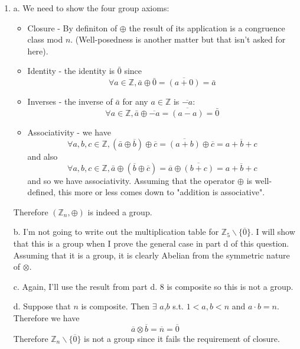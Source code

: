 \documentclass{article}
\newcommand{\chapternumber}{2}
\newenvironment{QandA}{\begin{enumerate}[label=\chapternumber.\arabic*]\bfseries\boldmath}
	{\end{enumerate}}
\newenvironment{answered}{\par\bigskip\normalfont\unboldmath}{}
\begin{document}
\begin{QandA}
		\item
		\begin{answered}
			a. We need to show the four group axioms:
			\begin{itemize}
				\item Closure - By definiton of $\oplus$ the result of its application is a congruence class mod $n$. (Well-posedness is another matter but that isn't asked for here).
				\item Identity - the identity is $\bar{0}$ since
				\[\forall a\in\mathbb{Z}, \bar{a} \oplus \bar{0} = \overline{(a + 0)} = \bar{a}\]
				\item Inverses - the inverse of $\bar{a}$ for any $a\in\mathbb{Z}$ is $\overline{-a}$:
				\[\forall a\in\mathbb{Z}, \bar{a} \oplus \overline{-a} = \overline{(a-a)} = \bar{0}\]
				\item Associativity - we have
				\[\forall a,b,c\in \mathbb{Z}, (\bar{a} \oplus \overline{b})\oplus \overline{c} = \overline{(a+b)}\oplus \overline{c} = \overline{a+b+c}\]
				and also
				\[\forall a,b,c\in \mathbb{Z}, \bar{a} \oplus (\overline{b}\oplus \overline{c}) = \overline{a} \oplus \overline{(b+c)} = \overline{a+b+c}\]
				and so we have associativity. Assuming that the operator $\oplus$ is well-defined, this more or less comes down to "addition is associative".
			\end{itemize}
			Therefore $(\mathbb{Z}_n,\oplus)$ is indeed a group.
			
			b. I'm not going to write out the multiplication table for $\mathbb{Z}_5\backslash\{\overline{0}\}$. I will show that this is a group when I prove the general case in part d of this question. Assuming that it is a group, it is clearly Abelian from the symmetric nature of $\otimes$.
			
			c. Again, I'll use the result from part d. 8 is composite so this is not a group.
			
			d. Suppose that $n$ is composite. Then $\exists$ $a$,$b$ s.t. $1<a,b<n$ and $a\cdot b=n$. Therefore we have 
			\[\overline{a}\otimes\overline{b}=\overline{n}=\overline{0}\]
			Therefore $\mathbb{Z}_n\backslash\{\overline{0}\}$ is not a group since it fails the requirement of closure.
			

\end{answered}
\end{QandA}
\end{document}
